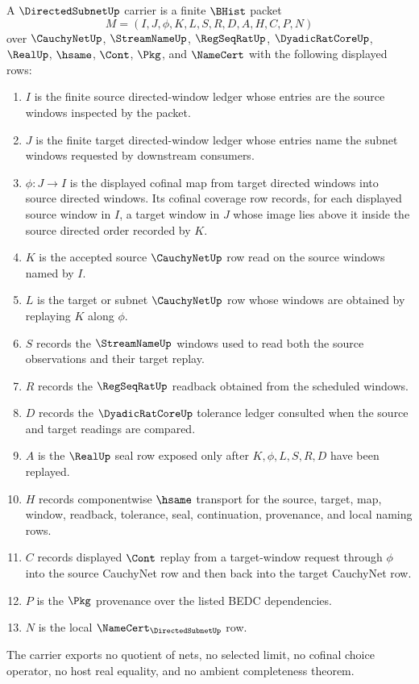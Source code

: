 \begin{definition}
\label{def:directed-subnet-carrier}
A $\DirectedSubnetUp$ carrier is a finite $\BHist$ packet
$$
M=(I,J,\phi,K,L,S,R,D,A,H,C,P,N)
$$
over $\CauchyNetUp$, $\StreamNameUp$, $\RegSeqRatUp$, $\DyadicRatCoreUp$, $\RealUp$, $\hsame$, $\Cont$, $\Pkg$, and $\NameCert$ with the following displayed rows:
\begin{enumerate}
\item $I$ is the finite source directed-window ledger whose entries are the source windows inspected by the packet.
\item $J$ is the finite target directed-window ledger whose entries name the subnet windows requested by downstream consumers.
\item $\phi:J\to I$ is the displayed cofinal map from target directed windows into source directed windows. Its cofinal coverage row records, for each displayed source window in $I$, a target window in $J$ whose image lies above it inside the source directed order recorded by $K$.
\item $K$ is the accepted source $\CauchyNetUp$ row read on the source windows named by $I$.
\item $L$ is the target or subnet $\CauchyNetUp$ row whose windows are obtained by replaying $K$ along $\phi$.
\item $S$ records the $\StreamNameUp$ windows used to read both the source observations and their target replay.
\item $R$ records the $\RegSeqRatUp$ readback obtained from the scheduled windows.
\item $D$ records the $\DyadicRatCoreUp$ tolerance ledger consulted when the source and target readings are compared.
\item $A$ is the $\RealUp$ seal row exposed only after $K,\phi,L,S,R,D$ have been replayed.
\item $H$ records componentwise $\hsame$ transport for the source, target, map, window, readback, tolerance, seal, continuation, provenance, and local naming rows.
\item $C$ records displayed $\Cont$ replay from a target-window request through $\phi$ into the source CauchyNet row and then back into the target CauchyNet row.
\item $P$ is the $\Pkg$ provenance over the listed BEDC dependencies.
\item $N$ is the local $\NameCert_{\DirectedSubnetUp}$ row.
\end{enumerate}
The carrier exports no quotient of nets, no selected limit, no cofinal choice operator, no host real equality, and no ambient completeness theorem.
\end{definition}

